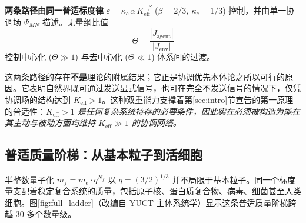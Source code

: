\documentclass[12pt,a4paper]{article}
\begin{document}
	\medskip
	\noindent
	\textbf{两条路径由同一普适标度律} \(\varepsilon = \kappa_c\,\alpha\,K_{\mathrm{eff}}^{-\beta}\) (\(\beta = 2/3,\ \kappa_c = 1/3\)) 控制，并由单一协调场 \(\Psi_{MN}\) 描述。无量纲比值
	\[
	\Theta = \frac{|J_{\mathrm{agent}}|}{|J_{\mathrm{env}}|}
	\]
	控制中心化 (\(\Theta \gg 1\)) 与去中心化 (\(\Theta \ll 1\)) 体系间的过渡。
	
	这两条路径的存在\textbf{不是}理论的附属结果；它正是协调优先本体论之所以可行的原因。它表明自然界既可通过发送显式信号，也可在完全不发送信号的情况下，仅凭协调场的结构达到 \(K_{\mathrm{eff}} > 1\)。这种双重能力支撑着第\ref{sec:intro}节宣告的第一原理的普适性：\emph{\(K_{\mathrm{eff}} > 1\) 是任何复杂系统持存的必要条件，因此实在必须被构造为能在其主动与被动方面均维持 \(K_{\mathrm{eff}} \gg 1\) 的协调网络。}
	
	\subsection{普适质量阶梯：从基本粒子到活细胞}
	\label{subsec:universal-ladder}
	
	半整数量子化 \(m_f = m_e \cdot q^{N_f}\) 以 \(q = (3/2)^{1/3}\) 并不局限于基本粒子。同一个标度量支配着稳定复合系统的质量，包括原子核、蛋白质复合物、病毒、细菌甚至人类细胞。图\ref{fig:full_ladder}（改编自 YUCT 主体系统学）显示这条普适质量阶梯跨越 30 多个数量级。
	
\end{document}
